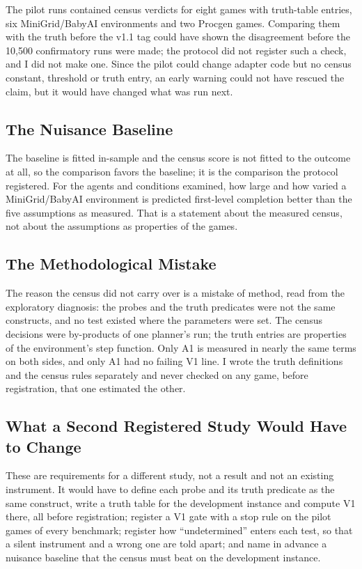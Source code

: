 \documentclass[journal]{IEEEtran}
\begin{document}
The pilot runs contained census verdicts for eight games with
truth-table entries, six MiniGrid/BabyAI environments and two Procgen
games. Comparing them with the truth before the v1.1 tag could have
shown the disagreement before the 10,500 confirmatory runs were made;
the protocol did not register such a check, and I did not make one.
Since the pilot could change adapter code but no census constant,
threshold or truth entry, an early warning could not have rescued the
claim, but it would have changed what was run next.

\subsection{The Nuisance Baseline}\label{the-nuisance-baseline}

The baseline is fitted in-sample and the census score is not fitted to
the outcome at all, so the comparison favors the baseline; it is the
comparison the protocol registered. For the agents and conditions
examined, how large and how varied a MiniGrid/BabyAI environment is
predicted first-level completion better than the five assumptions as
measured. That is a statement about the measured census, not about the
assumptions as properties of the games.

\subsection{The Methodological
Mistake}\label{the-methodological-mistake}

The reason the census did not carry over is a mistake of method, read
from the exploratory diagnosis: the probes and the truth predicates were
not the same constructs, and no test existed where the parameters were
set. The census decisions were by-products of one planner's run; the
truth entries are properties of the environment's step function. Only A1
is measured in nearly the same terms on both sides, and only A1 had no
failing V1 line. I wrote the truth definitions and the census rules
separately and never checked on any game, before registration, that one
estimated the other.

\subsection{What a Second Registered Study Would Have to
Change}\label{what-a-second-registered-study-would-have-to-change}

These are requirements for a different study, not a result and not an
existing instrument. It would have to define each probe and its truth
predicate as the same construct, write a truth table for the development
instance and compute V1 there, all before registration; register a V1
gate with a stop rule on the pilot games of every benchmark; register
how ``undetermined'' enters each test, so that a silent instrument and a
wrong one are told apart; and name in advance a nuisance baseline that
the census must beat on the development instance.
\end{document}
